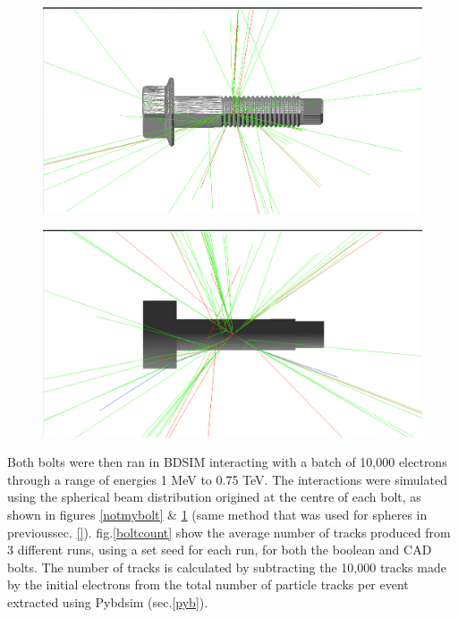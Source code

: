 \documentclass[12pt,a4paper]{article}
\begin{document}
\begin{figure}[h!]
\centering
\begin{minipage}{.5\textwidth}
  \centering
  \includegraphics[height=.5\linewidth]{Images//CAD_Screw//Screw_hnh_10MeVe.png}
  \label{notmybolt}
\end{minipage}%
\begin{minipage}{.5\textwidth}
  \centering
  \includegraphics[height=.5\linewidth]{Images//CAD_Screw//bensboltinbdsim.png}
  \label{mybolt}
\end{minipage}%
\end{figure}

\noindent Both bolts were then ran in BDSIM interacting with a batch of 10,000 electrons through a range of energies 1 MeV to 0.75 TeV. The interactions were simulated using the spherical beam distribution origined at the centre of each bolt, as shown in figures \ref{notmybolt} \& \ref{mybolt} (same method that was used for spheres in previoussec. \ref{}). fig.\ref{boltcount} show the average number of tracks produced from 3 different runs, using a set seed for each run, for both the boolean and CAD bolts. The number of tracks is calculated by subtracting the 10,000 tracks made by the initial electrons from the total number of particle tracks per event extracted using Pybdsim (sec.\ref{pyb}).
\end{document}
